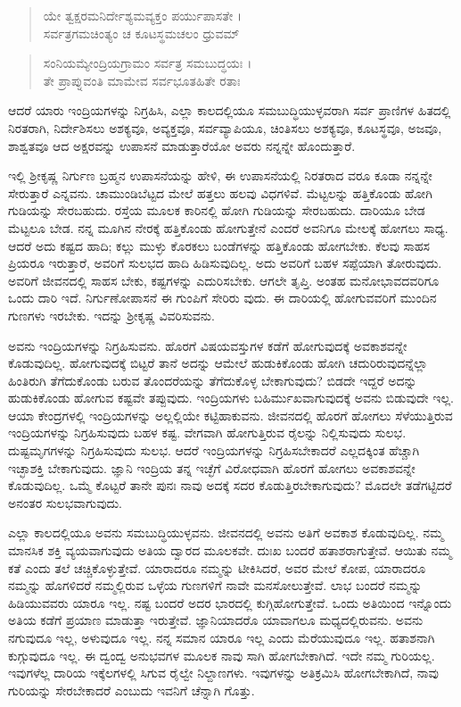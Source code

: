 \begin{verse}
ಯೇ ತ್ವಕ್ಷರಮನಿರ್ದೇಶ್ಯಮವ್ಯಕ್ತಂ ಪರ್ಯುಪಾಸತೇ ।\\ಸರ್ವತ್ರಗಮಚಿಂತ್ಯಂ ಚ ಕೂಟಸ್ಥಮಚಲಂ ಧ್ರುವಮ್ 
\end{verse}

\begin{verse}
ಸಂನಿಯಮ್ಯೇಂದ್ರಿಯಗ್ರಾಮಂ ಸರ್ವತ್ರ ಸಮಬುದ್ಧಯಃ ।\\ತೇ ಪ್ರಾಪ್ನುವಂತಿ ಮಾಮೇವ ಸರ್ವಭೂತಹಿತೇ ರತಾಃ 
\end{verse}

{\small ಆದರೆ ಯಾರು ಇಂದ್ರಿಯಗಳನ್ನು ನಿಗ್ರಹಿಸಿ, ಎಲ್ಲಾ ಕಾಲದಲ್ಲಿಯೂ ಸಮಬುದ್ಧಿಯುಳ್ಳವರಾಗಿ ಸರ್ವ ಪ್ರಾಣಿಗಳ ಹಿತದಲ್ಲಿ ನಿರತರಾಗಿ, ನಿರ್ದೇಶಿಸಲು ಅಶಕ್ಯವೂ, ಅವ್ಯಕ್ತವೂ, ಸರ್ವವ್ಯಾಪಿಯೂ, ಚಿಂತಿಸಲು ಅಶಕ್ಯವೂ, ಕೂಟಸ್ಥವೂ, ಅಜವೂ, ಶಾಶ್ವತವೂ ಆದ ಅಕ್ಷರವನ್ನು ಉಪಾಸನೆ ಮಾಡುತ್ತಾರೆಯೋ ಅವರು ನನ್ನನ್ನೇ ಹೊಂದುತ್ತಾರೆ.}

ಇಲ್ಲಿ ಶ್ರೀಕೃಷ್ಣ ನಿರ್ಗುಣ ಬ್ರಹ್ಮನ ಉಪಾಸನೆಯನ್ನು ಹೇಳಿ, ಈ ಉಪಾಸನೆಯಲ್ಲಿ ನಿರತರಾದ ವರೂ ಕೂಡಾ ನನ್ನನ್ನೇ ಸೇರುತ್ತಾರೆ ಎನ್ನವನು. ಚಾಮುಂಡಿಬೆಟ್ಟದ ಮೇಲೆ ಹತ್ತಲು ಹಲವು ವಿಧಗಳಿವೆ. ಮೆಟ್ಟಲನ್ನು ಹತ್ತಿಕೊಂಡು ಹೋಗಿ ಗುಡಿಯನ್ನು ಸೇರಬಹುದು. ರಸ್ತೆಯ ಮೂಲಕ ಕಾರಿನಲ್ಲಿ ಹೋಗಿ ಗುಡಿಯನ್ನು ಸೇರಬಹುದು. ದಾರಿಯೂ ಬೇಡ ಮೆಟ್ಟಲೂ ಬೇಡ. ನನ್ನ ಮೂಗಿನ ನೇರಕ್ಕೆ ಹತ್ತಿಕೊಂಡು ಹೋಗುತ್ತೇನೆ ಎಂದರೆ ಅವನಿಗೂ ಮೇಲಕ್ಕೆ ಹೋಗಲು ಸಾಧ್ಯ. ಆದರೆ ಅದು ಕಷ್ಟದ ಹಾದಿ; ಕಲ್ಲು ಮುಳ್ಳು ಕೊರಕಲು ಬಂಡೆಗಳನ್ನು ಹತ್ತಿಕೊಂಡು ಹೋಗಬೇಕು. ಕೆಲವು ಸಾಹಸ ಪ್ರಿಯರೂ ಇರುತ್ತಾರೆ, ಅವರಿಗೆ ಸುಲಭದ ಹಾದಿ ಹಿಡಿಸುವುದಿಲ್ಲ. ಅದು ಅವರಿಗೆ ಬಹಳ ಸಪ್ಪೆಯಾಗಿ ತೋರುವುದು. ಅವರಿಗೆ ಜೀವನದಲ್ಲಿ ಸಾಹಸ ಬೇಕು, ಕಷ್ಟಗಳನ್ನು ಎದುರಿಸಬೇಕು. ಆಗಲೇ ತೃಪ್ತಿ. ಅಂತಹ ಮನೋಭಾವದವರಿಗೂ ಒಂದು ದಾರಿ ಇದೆ. ನಿರ್ಗುಣೋಪಾಸನೆ ಈ ಗುಂಪಿಗೆ ಸೇರಿರು ವುದು. ಈ ದಾರಿಯಲ್ಲಿ ಹೋಗುವವರಿಗೆ ಮುಂದಿನ ಗುಣಗಳು ಇರಬೇಕು. ಇದನ್ನು ಶ್ರೀಕೃಷ್ಣ ವಿವರಿಸುವನು.

ಅವನು ಇಂದ್ರಿಯಗಳನ್ನು ನಿಗ್ರಹಿಸುವನು. ಹೊರಗೆ ವಿಷಯವಸ್ತುಗಳ ಕಡೆಗೆ ಹೋಗುವುದಕ್ಕೆ ಅವಕಾಶವನ್ನೇ ಕೊಡುವುದಿಲ್ಲ. ಹೋಗುವುದಕ್ಕೆ ಬಿಟ್ಟರೆ ತಾನೆ ಅದನ್ನು ಆಮೇಲೆ ಹುಡುಕಿಕೊಂಡು ಹೋಗಿ ಚದುರಿರುವುದನ್ನೆಲ್ಲಾ ಹಿಂತಿರುಗಿ ತೆಗೆದುಕೊಂಡು ಬರುವ ತೊಂದರೆಯನ್ನು ತೆಗೆದುಕೊಳ್ಳ ಬೇಕಾಗುವುದು? ಬಿಡದೇ ಇದ್ದರೆ ಅದನ್ನು ಹುಡುಕಿಕೊಂಡು ಹೋಗುವ ಕಷ್ಟವೇ ತಪ್ಪುವುದು. ಇಂದ್ರಿಯಗಳು ಬಹಿರ್ಮುಖವಾಗುವುದಕ್ಕೆ ಅವನು ಬಿಡುವುದೇ ಇಲ್ಲ. ಆಯಾ ಕೇಂದ್ರಗಳಲ್ಲಿ ಇಂದ್ರಿಯಗಳನ್ನು ಅಲ್ಲಲ್ಲಿಯೇ ಕಟ್ಟಿಹಾಕುವನು. ಜೀವನದಲ್ಲಿ ಹೊರಗೆ ಹೋಗಲು ಸೆಳೆಯುತ್ತಿರುವ ಇಂದ್ರಿಯಗಳನ್ನು ನಿಗ್ರಹಿಸುವುದು ಬಹಳ ಕಷ್ಟ. ವೇಗವಾಗಿ ಹೋಗುತ್ತಿರುವ ರೈಲನ್ನು ನಿಲ್ಲಿಸುವುದು ಸುಲಭ. ದುಷ್ಟಮೃಗಗಳನ್ನು ನಿಗ್ರಹಿಸುವುದು ಸುಲಭ. ಆದರೆ ಇಂದ್ರಿಯಗಳನ್ನು ನಿಗ್ರಹಿಸಬೇಕಾದರೆ ಎಲ್ಲದಕ್ಕಿಂತ ಹೆಚ್ಚಾಗಿ ಇಚ್ಛಾಶಕ್ತಿ ಬೇಕಾಗುವುದು. ಜ್ಞಾನಿ ಇಂದ್ರಿಯ ತನ್ನ ಇಚ್ಛೆಗೆ ವಿರೋಧವಾಗಿ ಹೊರಗೆ ಹೋಗಲು ಅವಕಾಶವನ್ನೇ ಕೊಡುವುದಿಲ್ಲ. ಒಮ್ಮೆ ಕೊಟ್ಟರೆ ತಾನೇ ಪುನಃ ನಾವು ಅದಕ್ಕೆ ಸದರ ಕೊಡುತ್ತಿರಬೇಕಾಗುವುದು? ಮೊದಲೇ ತಡೆಗಟ್ಟಿದರೆ ಅನಂತರ ಸುಲಭವಾಗುವುದು.

ಎಲ್ಲಾ ಕಾಲದಲ್ಲಿಯೂ ಅವನು ಸಮಬುದ್ಧಿಯುಳ್ಳವನು. ಜೀವನದಲ್ಲಿ ಅವನು ಅತಿಗೆ ಅವಕಾಶ ಕೊಡುವುದಿಲ್ಲ. ನಮ್ಮ ಮಾನಸಿಕ ಶಕ್ತಿ ವ್ಯಯವಾಗುವುದು ಅತಿಯ ದ್ವಾರದ ಮೂಲಕವೇ. ದುಃಖ ಬಂದರೆ ಹತಾಶರಾಗುತ್ತೇವೆ. ಆಯಿತು ನಮ್ಮ ಕತೆ ಎಂದು ತಲೆ ಚಚ್ಚಿಕೊಳ್ಳುತ್ತೇವೆ. ಯಾರಾದರೂ ನಮ್ಮನ್ನು ಟೀಕಿಸಿದರೆ, ಅವರ ಮೇಲೆ ಕೋಪ, ಯಾರಾದರೂ ನಮ್ಮನ್ನು ಹೊಗಳಿದರೆ ನಮ್ಮಲ್ಲಿರುವ ಒಳ್ಳೆಯ ಗುಣಗಳಿಗೆ ನಾವೇ ಮನಸೋಲುತ್ತೇವೆ. ಲಾಭ ಬಂದರೆ ನಮ್ಮನ್ನು ಹಿಡಿಯುವವರು ಯಾರೂ ಇಲ್ಲ. ನಷ್ಟ ಬಂದರೆ ಅದರ ಭಾರದಲ್ಲಿ ಕುಗ್ಗಿಹೋಗುತ್ತೇವೆ. ಒಂದು ಅತಿಯಿಂದ ಇನ್ನೊಂದು ಅತಿಯ ಕಡೆಗೆ ಪ್ರಯಾಣ ಮಾಡುತ್ತಾ ಇರುತ್ತೇವೆ. ಜ್ಞಾನಿಯಾದರೊ ಯಾವಾಗಲೂ ಮಧ್ಯದಲ್ಲಿರುವನು. ಅವನು ನಗುವುದೂ ಇಲ್ಲ, ಅಳುವುದೂ ಇಲ್ಲ. ನನ್ನ ಸಮಾನ ಯಾರೂ ಇಲ್ಲ ಎಂದು ಮೆರೆಯುವುದೂ ಇಲ್ಲ. ಹತಾಶನಾಗಿ ಕುಗ್ಗುವುದೂ ಇಲ್ಲ. ಈ ದ್ವಂದ್ವ ಅನುಭವಗಳ ಮೂಲಕ ನಾವು ಸಾಗಿ ಹೋಗಬೇಕಾಗಿದೆ. ಇದೇ ನಮ್ಮ ಗುರಿಯಲ್ಲ. ಇವುಗಳೆಲ್ಲ ದಾರಿಯ ಇಕ್ಕೆಲಗಳಲ್ಲಿ ಸಿಗುವ ರೈಲ್ವೇ ನಿಲ್ದಾಣಗಳು. ಇವುಗಳನ್ನು ಅತಿಕ್ರಮಿಸಿ ಹೋಗಬೇಕಾಗಿದೆ, ನಾವು ಗುರಿಯನ್ನು ಸೇರಬೇಕಾದರೆ ಎಂಬುದು ಇವನಿಗೆ ಚೆನ್ನಾಗಿ ಗೊತ್ತು.

